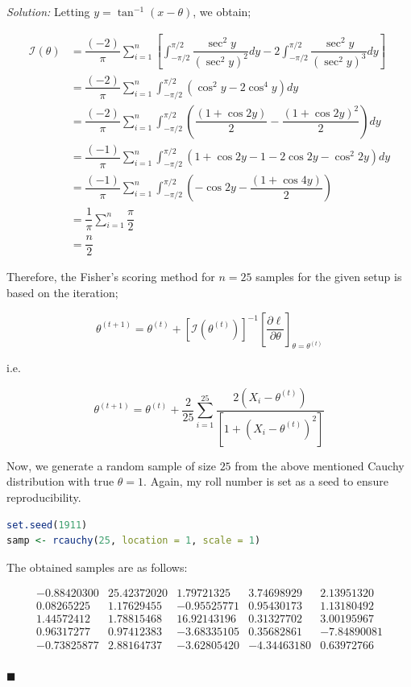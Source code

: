 \documentclass[12pt]{article}
\theoremstyle{definition}
\newenvironment{answer}{\textit{Solution: }\quad }{ \hfill $\blacksquare$}
\numberwithin{equation}{section}
\begin{document}
\begin{answer}
    Letting $y = \tan^{-1}(x -\theta)$, we obtain;

    \begin{align*}
        \mathcal{I}(\theta)
        & = \dfrac{(-2)}{\pi} \sum_{i = 1}^{n} \left[ \int_{-\pi/2}^{\pi/2} \dfrac{\sec^2 y}{(\sec^2 y)^2}dy - 2 \int_{-\pi/2}^{\pi/2} \dfrac{\sec^2 y}{(\sec^2 y)^3}dy \right]\\
        & = \dfrac{(-2)}{\pi} \sum_{i = 1}^{n} \int_{-\pi/2}^{\pi/2} (\cos^2 y - 2\cos^4 y)dy\\
        & = \dfrac{(-2)}{\pi} \sum_{i = 1}^{n} \int_{-\pi/2}^{\pi/2} \left(\dfrac{(1 + \cos 2y)}{2} - \dfrac{(1 + \cos 2y)^2}{2} \right) dy \\
        & = \dfrac{(-1)}{\pi} \sum_{i = 1}^{n} \int_{-\pi/2}^{\pi/2} (1 + \cos 2y - 1 - 2\cos 2y - \cos^2 2y) dy\\
        & = \dfrac{(-1)}{\pi} \sum_{i = 1}^{n} \int_{-\pi/2}^{\pi/2} \left( -\cos 2y - \dfrac{(1 + \cos 4y)}{2} \right)\\
        & = \dfrac{1}{\pi} \sum_{i=1}^{n} \dfrac{\pi}{2}\\
        & = \dfrac{n}{2}
    \end{align*}

    Therefore, the Fisher's scoring method for $n = 25$ samples for the given setup is based on the iteration;

    $$\theta^{(t+1)} = \theta^{(t)} + \left[\mathcal{I}(\theta^{(t)})\right]^{-1} \left[ \dfrac{\partial \ell}{\partial \theta} \right]_{\theta = \theta^{(t)}}$$

    i.e.

    \begin{equation}
        \theta^{(t+1)} = \theta^{(t)} + \dfrac{2}{25} \sum_{i=1}^{25} \dfrac{2(X_i - \theta^{(t)})}{\left[ 1 + (X_i - \theta^{(t)})^2 \right]}
        \label{eqn:13-1}        
    \end{equation}


    Now, we generate a random sample of size $25$ from the above mentioned Cauchy distribution with true $\theta = 1$. Again, my roll number is set as a seed to ensure reproducibility.

\begin{lstlisting}[language = R]
set.seed(1911)
samp <- rcauchy(25, location = 1, scale = 1)
\end{lstlisting}

    The obtained samples are as follows:

    $$
    \begin{array}{ccccc}
        -0.88420300 & 25.42372020 & 1.79721325 & 3.74698929 & 2.13951320\\
        0.08265225 & 1.17629455 & -0.95525771 & 0.95430173 & 1.13180492\\
        1.44572412 & 1.78815468 & 16.92143196 & 0.31327702 & 3.00195967\\
        0.96317277 & 0.97412383 & -3.68335105 & 0.35682861 & -7.84890081\\
        -0.73825877 & 2.88164737 & -3.62805420 & -4.34463180 & 0.63972766\\
    \end{array}
    $$


\end{answer}
\end{document}
